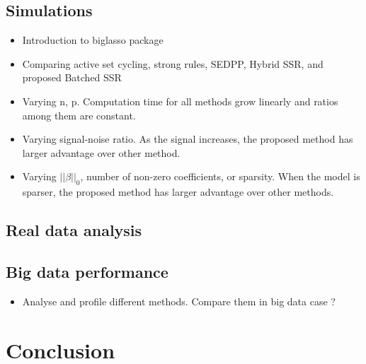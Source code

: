 \documentclass{article}
\begin{document}
\subsection{Simulations}
\label{sec:sim}
\begin{itemize}
    \item Introduction to biglasso package
\end{itemize}
\begin{itemize}
    \item Comparing active set cycling, strong rules, SEDPP, Hybrid SSR, and proposed Batched SSR
    \item Varying n, p. Computation time for all methods grow linearly and ratios among them are constant.
    \item Varying signal-noise ratio. As the signal increases, the proposed method has larger advantage over other method.
    \item Varying $||\beta||_0$, number of non-zero coefficients, or sparsity. When the model is sparser, the proposed method has larger advantage over other methods.
\end{itemize}

\subsection{Real data analysis}
\label{sec:real-data}

\subsection{Big data performance}

\begin{itemize}
    \item Analyse and profile different methods. Compare them in big data case ?
\end{itemize}

\section{Conclusion}
\label{sec:6}




\end{document}
